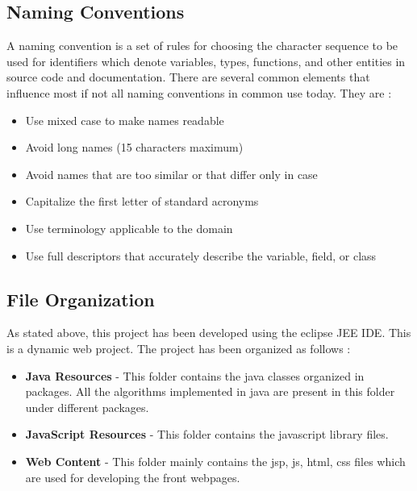 \documentclass[12pt,a4paper]{report}
\begin{document}
\subsection{Naming Conventions}
 A naming convention is a set of rules for choosing the character sequence to be used for identifiers which denote variables, types, functions, and other entities in source code and documentation.  There are several common elements that influence most if not all naming conventions in common use today. They are :
\begin{itemize}
\item Use mixed case to make names readable
\item Avoid long names (15 characters maximum)
\item Avoid names that are too similar or that differ only in case
\item Capitalize the first letter of standard acronyms
\item Use terminology applicable to the domain
\item Use full descriptors that accurately describe the variable, field, or class
\end{itemize}
\subsection{File Organization}
As stated above, this project has been developed using the eclipse JEE IDE. This is a dynamic web project. The project has been organized as follows :
\begin{itemize}
\item\textbf{Java Resources} - This folder contains the java classes organized in packages. All the algorithms implemented in java are present in this folder under different packages.
\item\textbf{JavaScript Resources} - This folder contains the javascript library files.
\item\textbf{Web Content} - This folder mainly contains the jsp, js, html, css files which are used for developing the front webpages.
\end{itemize}
\end{document}
